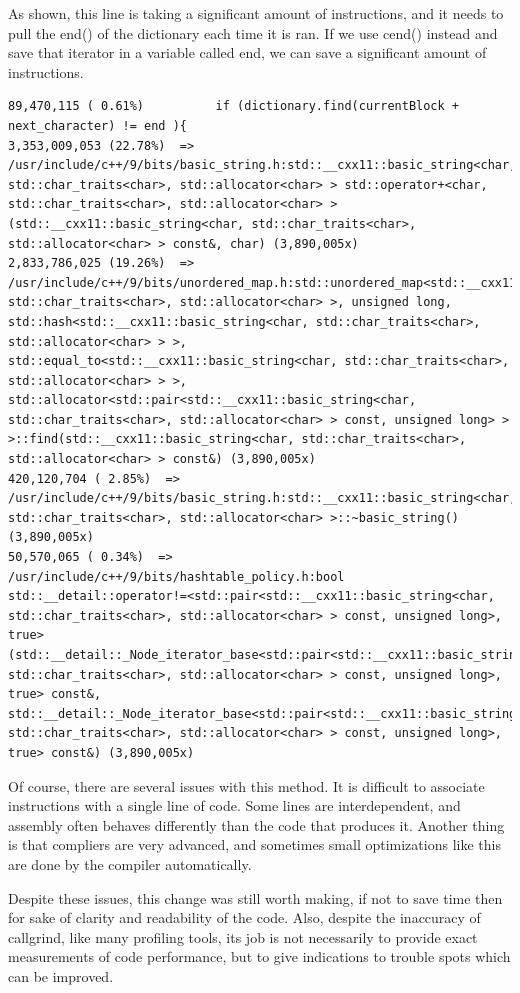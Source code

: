 \documentclass[12pt,twoside]{reedthesis}
\begin{document}
As shown, this line is taking a significant amount of instructions, and it needs to pull the end() of the dictionary each time it is ran. If we use cend() instead and save that iterator in a variable called end, we can save a significant amount of instructions.
\begin{verbatim}
89,470,115 ( 0.61%)          if (dictionary.find(currentBlock + next_character) != end ){
3,353,009,053 (22.78%)  => /usr/include/c++/9/bits/basic_string.h:std::__cxx11::basic_string<char, std::char_traits<char>, std::allocator<char> > std::operator+<char, std::char_traits<char>, std::allocator<char> >(std::__cxx11::basic_string<char, std::char_traits<char>, std::allocator<char> > const&, char) (3,890,005x)
2,833,786,025 (19.26%)  => /usr/include/c++/9/bits/unordered_map.h:std::unordered_map<std::__cxx11::basic_string<char, std::char_traits<char>, std::allocator<char> >, unsigned long, std::hash<std::__cxx11::basic_string<char, std::char_traits<char>, std::allocator<char> > >, std::equal_to<std::__cxx11::basic_string<char, std::char_traits<char>, std::allocator<char> > >, std::allocator<std::pair<std::__cxx11::basic_string<char, std::char_traits<char>, std::allocator<char> > const, unsigned long> > >::find(std::__cxx11::basic_string<char, std::char_traits<char>, std::allocator<char> > const&) (3,890,005x)
420,120,704 ( 2.85%)  => /usr/include/c++/9/bits/basic_string.h:std::__cxx11::basic_string<char, std::char_traits<char>, std::allocator<char> >::~basic_string() (3,890,005x)
50,570,065 ( 0.34%)  => /usr/include/c++/9/bits/hashtable_policy.h:bool std::__detail::operator!=<std::pair<std::__cxx11::basic_string<char, std::char_traits<char>, std::allocator<char> > const, unsigned long>, true>(std::__detail::_Node_iterator_base<std::pair<std::__cxx11::basic_string<char, std::char_traits<char>, std::allocator<char> > const, unsigned long>, true> const&, std::__detail::_Node_iterator_base<std::pair<std::__cxx11::basic_string<char, std::char_traits<char>, std::allocator<char> > const, unsigned long>, true> const&) (3,890,005x)
\end{verbatim}
Of course, there are several issues with this method. It is difficult to associate instructions with a single line of code. Some lines are interdependent, and assembly often behaves differently than the code that produces it. Another thing is that compliers are very advanced, and sometimes small optimizations like this are done by the compiler automatically.

Despite these issues, this change was still worth making, if not to save time then for sake of clarity and readability of the code. Also, despite the inaccuracy of callgrind, like many profiling tools, its job is not necessarily to provide exact measurements of code performance, but to give indications to trouble spots which can be improved.
\end{document}
